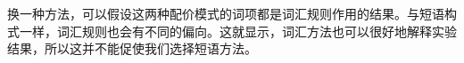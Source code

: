 \begin{exe}
\begin{xlist}[iv.]
\begin{exe}
\begin{xlist}[iv.]

换一种方法，可以假设这两种配价模式的词项都是词汇规则作用的结果。与短语构式一样，词汇规则也会有不同的偏向。这就显示，词汇方法也可以很好地解释实验结果，所以这并不能促使我们选择短语方法。


\end{xlist}
\end{exe}
\end{xlist}
\end{exe}
